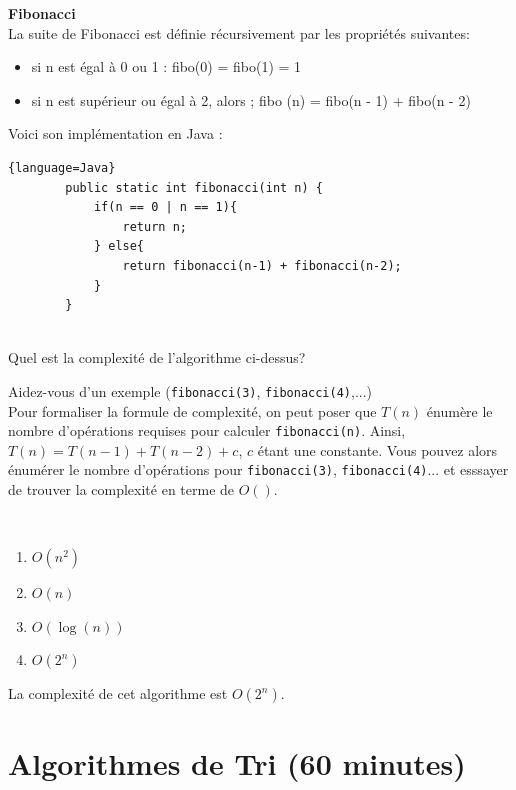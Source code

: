 \begin{Exercice} [10 minutes] \textbf{Fibonacci}\\
La suite de Fibonacci est définie récursivement par les propriétés suivantes:
\begin{itemize}
    \item si n est égal à 0 ou 1 : fibo(0) = fibo(1) = 1
    \item si n est supérieur ou égal à 2, alors ; fibo (n) = fibo(n - 1) + fibo(n - 2)
\end{itemize}

Voici son implémentation en Java :

\begin{lstlisting}{language=Java}
        public static int fibonacci(int n) {
            if(n == 0 | n == 1){
                return n;
            } else{
                return fibonacci(n-1) + fibonacci(n-2);
            }
        }
        
\end{lstlisting}

Quel est la complexité de l'algorithme ci-dessus?

\begin{conseil}
Aidez-vous d'un exemple (\lstinline{fibonacci(3)}, \lstinline{fibonacci(4)},...) \\
Pour formaliser la formule de complexité, on peut poser que $T(n)$ énumère le nombre d'opérations requises pour calculer \lstinline{fibonacci(n)}. Ainsi, $T(n) = T(n-1) + T(n-2) + c$, $c$ étant une constante. Vous pouvez alors énumérer le nombre d'opérations pour \lstinline{fibonacci(3)}, \lstinline{fibonacci(4)}... et esssayer de trouver la complexité en terme de $O()$.
\end{conseil}

\ \\

\begin{enumerate}
    \item $O(n^2)$
    \item $O(n)$
    \item $O(\log(n))$
    \item $O(2^n)$
\end{enumerate}

\begin{solution}
    La complexité de cet algorithme est $O(2^n)$.
\end{solution}
\end{Exercice}

\section{Algorithmes de Tri (60 minutes)}


